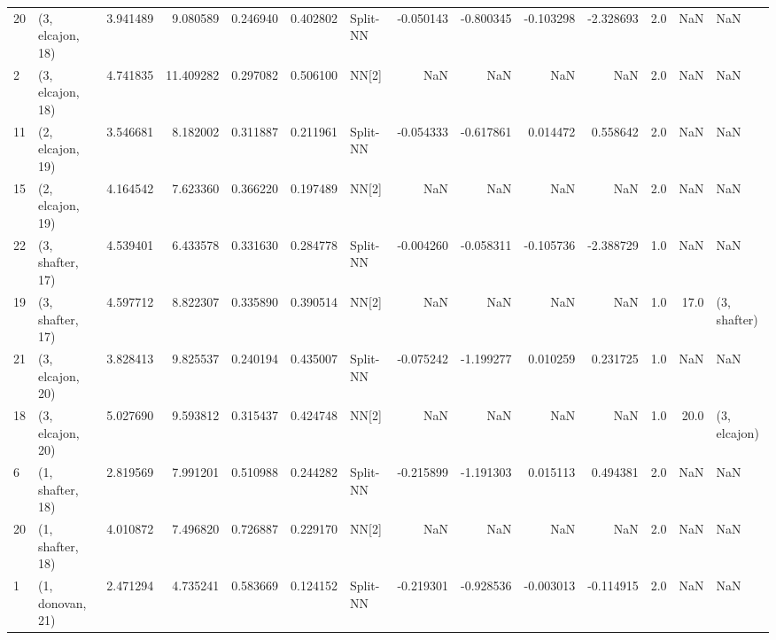 \begin{tabular}{llrrrrlrrrrrrl}
20 &  (3, elcajon, 18) &  3.941489 &   9.080589 &   0.246940 &  0.402802 &    Split-NN &       -0.050143 &     -0.800345 &      -0.103298 &    -2.328693 &            2.0 &    NaN &              NaN \\
2  &  (3, elcajon, 18) &  4.741835 &  11.409282 &   0.297082 &  0.506100 &       NN[2] &             NaN &           NaN &            NaN &          NaN &            2.0 &    NaN &              NaN \\
11 &  (2, elcajon, 19) &  3.546681 &   8.182002 &   0.311887 &  0.211961 &    Split-NN &       -0.054333 &     -0.617861 &       0.014472 &     0.558642 &            2.0 &    NaN &              NaN \\
15 &  (2, elcajon, 19) &  4.164542 &   7.623360 &   0.366220 &  0.197489 &       NN[2] &             NaN &           NaN &            NaN &          NaN &            2.0 &    NaN &              NaN \\
22 &  (3, shafter, 17) &  4.539401 &   6.433578 &   0.331630 &  0.284778 &    Split-NN &       -0.004260 &     -0.058311 &      -0.105736 &    -2.388729 &            1.0 &    NaN &              NaN \\
19 &  (3, shafter, 17) &  4.597712 &   8.822307 &   0.335890 &  0.390514 &       NN[2] &             NaN &           NaN &            NaN &          NaN &            1.0 &   17.0 &     (3, shafter) \\
21 &  (3, elcajon, 20) &  3.828413 &   9.825537 &   0.240194 &  0.435007 &    Split-NN &       -0.075242 &     -1.199277 &       0.010259 &     0.231725 &            1.0 &    NaN &              NaN \\
18 &  (3, elcajon, 20) &  5.027690 &   9.593812 &   0.315437 &  0.424748 &       NN[2] &             NaN &           NaN &            NaN &          NaN &            1.0 &   20.0 &     (3, elcajon) \\
6  &  (1, shafter, 18) &  2.819569 &   7.991201 &   0.510988 &  0.244282 &    Split-NN &       -0.215899 &     -1.191303 &       0.015113 &     0.494381 &            2.0 &    NaN &              NaN \\
20 &  (1, shafter, 18) &  4.010872 &   7.496820 &   0.726887 &  0.229170 &       NN[2] &             NaN &           NaN &            NaN &          NaN &            2.0 &    NaN &              NaN \\
1  &  (1, donovan, 21) &  2.471294 &   4.735241 &   0.583669 &  0.124152 &    Split-NN &       -0.219301 &     -0.928536 &      -0.003013 &    -0.114915 &            2.0 &    NaN &              NaN \\

\end{tabular}
